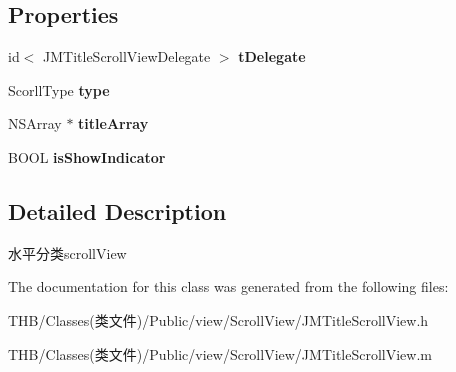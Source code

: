 \subsection*{Properties}
\begin{DoxyCompactItemize}
\item 
\mbox{\label{interface_j_m_title_scroll_view_a80929b69a9b87da95d37840b77c3a2a5}} 
id$<$ J\+M\+Title\+Scroll\+View\+Delegate $>$ {\bfseries t\+Delegate}
\item 
\mbox{\label{interface_j_m_title_scroll_view_aed9281db52e6edbad3b97cd25b432a33}} 
Scorll\+Type {\bfseries type}
\item 
\mbox{\label{interface_j_m_title_scroll_view_aed9d5c780d701469dd16170253eba644}} 
N\+S\+Array $\ast$ {\bfseries title\+Array}
\item 
\mbox{\label{interface_j_m_title_scroll_view_ae3166e80612b0f1db5e15509a653c8ad}} 
B\+O\+OL {\bfseries is\+Show\+Indicator}
\end{DoxyCompactItemize}


\subsection{Detailed Description}
水平分类scroll\+View 

The documentation for this class was generated from the following files\+:\begin{DoxyCompactItemize}
\item 
T\+H\+B/\+Classes(类文件)/\+Public/view/\+Scroll\+View/J\+M\+Title\+Scroll\+View.\+h\item 
T\+H\+B/\+Classes(类文件)/\+Public/view/\+Scroll\+View/J\+M\+Title\+Scroll\+View.\+m\end{DoxyCompactItemize}

